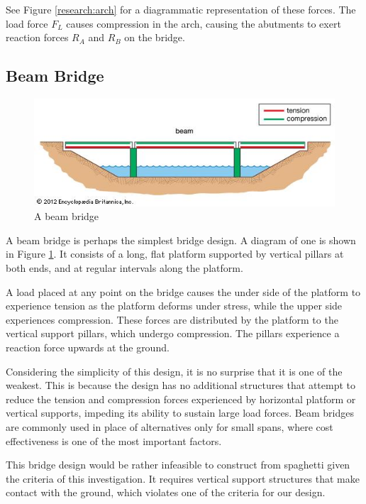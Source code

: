 \documentclass[a4paper,11pt]{article}
\begin{document}
See Figure \ref{research:arch} for a diagrammatic representation of these
forces.
The load force $F_L$ causes compression in the arch, causing the abutments to
exert reaction forces $R_A$ and $R_B$ on the bridge.


\subsection{Beam Bridge}

\begin{figure}
\begin{center}
\includegraphics[width=\textwidth]{figures/beam.jpg}
\end{center}
\caption{A beam bridge}
\label{research:beam}
\end{figure}

A beam bridge is perhaps the simplest bridge design.
A diagram of one is shown in Figure \ref{research:beam}.
It consists of a long, flat platform supported by vertical pillars at both ends,
and at regular intervals along the platform.

A load placed at any point on the bridge causes the under side of the platform
to experience tension as the platform deforms under stress, while the upper side
experiences compression.
These forces are distributed by the platform to the vertical support pillars,
which undergo compression.
The pillars experience a reaction force upwards at the ground.

Considering the simplicity of this design, it is no surprise that it is one of
the weakest.
This is because the design has no additional structures that attempt to reduce
the tension and compression forces experienced by horizontal platform or
vertical supports, impeding its ability to sustain large load forces.
Beam bridges are commonly used in place of alternatives only for small spans,
where cost effectiveness is one of the most important factors.

This bridge design would be rather infeasible to construct from spaghetti given
the criteria of this investigation.
It requires vertical support structures that make contact with the ground,
which violates one of the criteria for our design.
\end{document}
